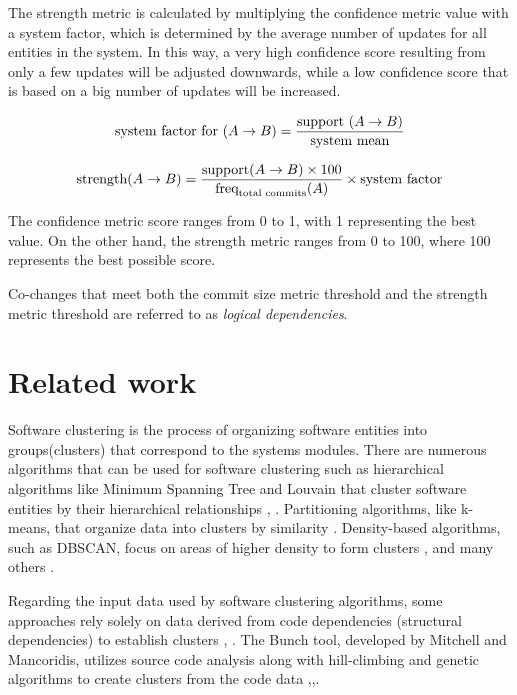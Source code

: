 \documentclass[conference]{IEEEtran}
\begin{document}
 The strength metric is calculated by multiplying the confidence metric value with a system factor, which is determined by the average number of updates for all entities in the system. In this way, a very high confidence score resulting from only a few updates will be adjusted downwards, while a low confidence score that is based on a big number of updates will be increased.

\begin{equation}
\small
\text{system factor for }(A \rightarrow B) = \frac{\text{support }(A \rightarrow B)}{\text{system mean}}
\end{equation}

\begin{equation}
\small
\text{strength}(A \rightarrow B) = \frac{\text{support}(A \rightarrow B) \times 100}{\text{freq}_{\text{total commits}}(A)} \times \text{system factor}
\end{equation}

The confidence metric score ranges from 0 to 1, with 1 representing the best value. On the other hand, the strength metric ranges from 0 to 100, where 100 represents the best possible score.

Co-changes that meet both the commit size metric threshold and the strength metric threshold are referred to as \textit{logical dependencies}.

\section{Related work}
\label{related_work}

Software clustering is the process of organizing software entities into groups(clusters) that correspond to the systems modules. There are numerous algorithms that can be used for software clustering such as hierarchical algorithms like Minimum Spanning Tree and Louvain that cluster software entities by their hierarchical relationships \cite{hicluster}, \cite{SoraSem13}. Partitioning algorithms, like k-means, that organize data into clusters by similarity \cite{5453745}. Density-based algorithms, such as DBSCAN, focus on areas of higher density to form clusters \cite{10.1145/304181.304187}, and many others \cite{Xu2015ACS}. 


Regarding the input data used by software clustering algorithms, some approaches rely solely on data derived from code dependencies (structural dependencies) to establish clusters \cite{SoraSem13}, \cite{891477}. The Bunch tool, developed by Mitchell and Mancoridis, utilizes source code analysis along with hill-climbing and genetic algorithms to create clusters from the code data \cite{Bunch1},\cite{Bunch2},\cite{Bunch3}.
\end{document}
